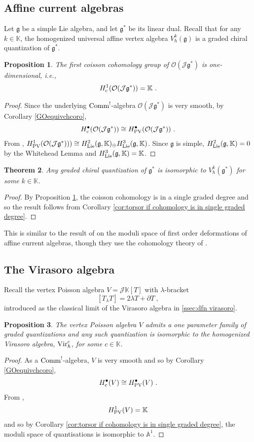 \documentclass[11pt]{amsart}
\numberwithin{equation}{section}
\newtheorem{theo}{Theorem}[section]
\newtheorem{prop}[theo]{Proposition}
\theoremstyle{definition}
\newcommand{\bb}{\mathbb}
\newcommand{\mc}{\mathcal}
\newcommand{\ik}{{\bb K}}
\newcommand{\Comm}{{\textup{Comm}}}
\newcommand{\Lie}{{\textup{Lie}}}
\newcommand{\Vir}{{\textup{Vir}}}
\newcommand{\0}{{\textbf{0}}}
\def\JJ{{\mc J}}
\def\OO{{\mc O}}
\def\gf{\mathfrak{g}}
\def \ie{{\it i.e.}}
\begin{document}
\subsection{Affine current algebras}

Let $\gf$ be a simple Lie algebra, and let $\gf^*$ be its linear dual. Recall that for any $k\in \ik$, the homogenized universal affine vertex algebra $V^k_\hbar(\gf)$ is a graded chiral quantization of $\gf^*$.

\begin{prop}\label{prop:coisson cohomology of akm}
	The first coisson cohomology group of $\OO(\JJ\gf^*)$ is one-dimensional, \ie,
	\[
	H^1_{\rm c}(\OO(\JJ \gf^*)) = \ik~.
	\]
\end{prop}
\begin{proof}
	Since the underlying $\Comm^!$-algebra $\OO(\JJ\gf^*)$ is very smooth, by Corollary \ref{GOequivchcoro},
	\[
	H^\bullet_{c}(\OO(\JJ \gf^*))\cong H^\bullet_{\rm PV}(\OO(\JJ \gf^*))~.
	\]
From \cite{Bakalov:2020computation}, $H^1_{\rm PV}(\OO(\JJ\gf^*)))\cong H^2_{\Lie}(\gf,\ik)_\oplus H^3_{\Lie}(\gf,\ik)$. Since $\gf$ is simple, $H^2_{\Lie}(\gf,\ik)=0$ by the Whitehead Lemma and $H^3_{\Lie}(\gf,\ik)=\ik$.
\end{proof}

\begin{theo}
	Any graded chiral quantization of $\gf^*$ is isomorphic to $V^k_\hbar(\gf^*)$ for some $k\in \ik$. 
\end{theo}
\begin{proof}
	By Proposition \ref{prop:coisson cohomology of akm}, the coisson cohomology is in a single graded degree and so the result follows from Corollary \ref{cor:torsor if cohomology is in single graded degree}.
\end{proof}

This is similar to the result of \cite{Kovalchuk:2024rwd} on the moduli space of first order deformations of affine current algebras, though they use the cohomology theory of \cite{Huang:2010ud}.

\subsection{The Virasoro algebra}
Recall the vertex Poisson algebra $V = \JJ \ik[T]$ with $\lambda$-bracket
\[
[T_\lambda T] = 2\lambda T +\partial T~,
\]
introduced as the classical limit of the Virasoro algebra in \ref{ssec:dfn virasoro}.

\begin{prop}
	The vertex Poisson algebra $V$ admits a one parameter family of graded quantizations and any such quantization is isomorphic to the homogenized Virasoro algebra, $\Vir^c_{\hbar}$, for some $c\in \ik$.
\end{prop}
\begin{proof}
 As a $\Comm^!$-algebra, $V $ is very smooth and so by Corollary \ref{GOequivchcoro},
 \[
 H^\bullet_{\rm c}(V) \cong H^\bullet_{\rm PV}(V)~.
 \]
 From \cite{Bakalov:2020computation}, 
 \[
 H^1_{\rm PV}(V) = \ik
 \]
 and so by Corollary \ref{cor:torsor if cohomology is in single graded degree}, the moduli space of quantisations is isomorphic to ${\bb A^1}$.
\end{proof}
\end{document}
